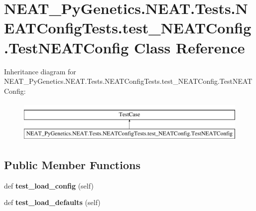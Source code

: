 \hypertarget{class_n_e_a_t___py_genetics_1_1_n_e_a_t_1_1_tests_1_1_n_e_a_t_config_tests_1_1test___n_e_a_t_config_1_1_test_n_e_a_t_config}{}\section{N\+E\+A\+T\+\_\+\+Py\+Genetics.\+N\+E\+A\+T.\+Tests.\+N\+E\+A\+T\+Config\+Tests.\+test\+\_\+\+N\+E\+A\+T\+Config.\+Test\+N\+E\+A\+T\+Config Class Reference}
\label{class_n_e_a_t___py_genetics_1_1_n_e_a_t_1_1_tests_1_1_n_e_a_t_config_tests_1_1test___n_e_a_t_config_1_1_test_n_e_a_t_config}
Inheritance diagram for N\+E\+A\+T\+\_\+\+Py\+Genetics.\+N\+E\+A\+T.\+Tests.\+N\+E\+A\+T\+Config\+Tests.\+test\+\_\+\+N\+E\+A\+T\+Config.\+Test\+N\+E\+A\+T\+Config\+:\begin{figure}[H]
\begin{center}
\leavevmode
\includegraphics[height=2.000000cm]{class_n_e_a_t___py_genetics_1_1_n_e_a_t_1_1_tests_1_1_n_e_a_t_config_tests_1_1test___n_e_a_t_config_1_1_test_n_e_a_t_config}
\end{center}
\end{figure}
\subsection*{Public Member Functions}
\begin{DoxyCompactItemize}
\item 
def {\bfseries test\+\_\+load\+\_\+config} (self)\hypertarget{class_n_e_a_t___py_genetics_1_1_n_e_a_t_1_1_tests_1_1_n_e_a_t_config_tests_1_1test___n_e_a_t_config_1_1_test_n_e_a_t_config_af0a8dbda0ccd83925dc128d89eda15d1}{}\label{class_n_e_a_t___py_genetics_1_1_n_e_a_t_1_1_tests_1_1_n_e_a_t_config_tests_1_1test___n_e_a_t_config_1_1_test_n_e_a_t_config_af0a8dbda0ccd83925dc128d89eda15d1}

\item 
def {\bfseries test\+\_\+load\+\_\+defaults} (self)\hypertarget{class_n_e_a_t___py_genetics_1_1_n_e_a_t_1_1_tests_1_1_n_e_a_t_config_tests_1_1test___n_e_a_t_config_1_1_test_n_e_a_t_config_af2a32fc9eb41393f00eebc5cee9e04b1}{}\label{class_n_e_a_t___py_genetics_1_1_n_e_a_t_1_1_tests_1_1_n_e_a_t_config_tests_1_1test___n_e_a_t_config_1_1_test_n_e_a_t_config_af2a32fc9eb41393f00eebc5cee9e04b1}

\end{DoxyCompactItemize}


